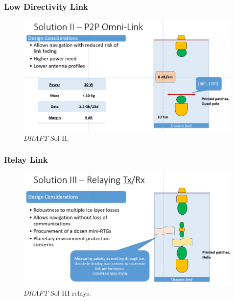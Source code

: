 \subsubsection{Low Directivity Link}
\begin{figure}[htb]
	\centering
	\includegraphics[width=\textwidth]{figures/comms/iceLink-p2p-LowD}
	\caption{ \textit{DRAFT} Sol II.}
	\label{fig:iceLink-p2p-LowD}
\end{figure}

\subsubsection{Relay Link}
\begin{figure}[htb]
	\centering
	\includegraphics[width=\textwidth]{figures/comms/iceLink-relay}
	\caption{ \textit{DRAFT} Sol III relays.}
	\label{fig:iceLink-relay}
\end{figure}
